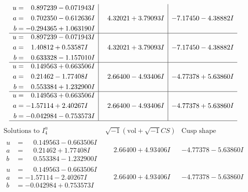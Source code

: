 \documentclass[1p]{elsarticle_modified}
\theoremstyle{definition}
\newcommand{\I}{\sqrt{-1}}
\begin{document}
$$\begin{array}{c|c|c}
\begin{aligned}
u &= \phantom{-}0.897239 - 0.071943 I \\
a &= \phantom{-}0.702350 - 0.612636 I \\
b &= -0.294365 + 1.063190 I\end{aligned}
 & \phantom{-}4.32021 + 3.79093 I & -7.17450 - 4.38882 I \\ \hline\begin{aligned}
u &= \phantom{-}0.897239 - 0.071943 I \\
a &= \phantom{-}1.40812 + 0.53587 I \\
b &= \phantom{-}0.633328 - 1.157010 I\end{aligned}
 & \phantom{-}4.32021 + 3.79093 I & -7.17450 - 4.38882 I \\ \hline\begin{aligned}
u &= \phantom{-}0.149563 + 0.663506 I \\
a &= \phantom{-}0.21462 - 1.77408 I \\
b &= \phantom{-}0.553384 + 1.232900 I\end{aligned}
 & \phantom{-}2.66400 - 4.93406 I & -4.77378 + 5.63860 I \\ \hline\begin{aligned}
u &= \phantom{-}0.149563 + 0.663506 I \\
a &= -1.57114 + 2.40267 I \\
b &= -0.042984 - 0.753573 I\end{aligned}
 & \phantom{-}2.66400 - 4.93406 I & -4.77378 + 5.63860 I\\
 \hline 
 \end{array}$$\newpage$$\begin{array}{c|c|c}  
\text{Solutions to }I^u_{4}& \I (\text{vol} + \sqrt{-1}CS) & \text{Cusp shape}\\
 \hline 
\begin{aligned}
u &= \phantom{-}0.149563 - 0.663506 I \\
a &= \phantom{-}0.21462 + 1.77408 I \\
b &= \phantom{-}0.553384 - 1.232900 I\end{aligned}
 & \phantom{-}2.66400 + 4.93406 I & -4.77378 - 5.63860 I \\ \hline\begin{aligned}
u &= \phantom{-}0.149563 - 0.663506 I \\
a &= -1.57114 - 2.40267 I \\
b &= -0.042984 + 0.753573 I\end{aligned}
 & \phantom{-}2.66400 + 4.93406 I & -4.77378 - 5.63860 I \\ \hline\begin{aligned}

\end{aligned}
\end{array}$$
\end{document}
